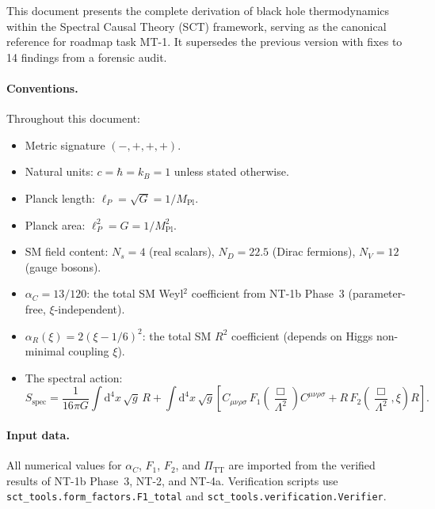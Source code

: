 \documentclass[11pt,a4paper]{article}
\renewcommand{\dd}{\mathrm{d}}
\newcommand{\PiTT}{\Pi_{\mathrm{TT}}}
\newcommand{\lP}{\ell_P}
\newcommand{\MP}{M_{\mathrm{Pl}}}
\theoremstyle{plain}
\theoremstyle{definition}
\begin{document}
This document presents the complete derivation of black hole thermodynamics
within the Spectral Causal Theory (SCT) framework, serving as the canonical
reference for roadmap task MT-1. It supersedes the previous version with
fixes to 14 findings from a forensic audit.

\paragraph{Conventions.}
Throughout this document:
\begin{itemize}[nosep]
  \item Metric signature $(-,+,+,+)$.
  \item Natural units: $c = \hbar = k_B = 1$ unless stated otherwise.
  \item Planck length: $\lP = \sqrt{G} = 1/\MP$.
  \item Planck area: $\lP^2 = G = 1/\MP^2$.
  \item SM field content: $N_s = 4$ (real scalars), $N_D = 22.5$ (Dirac fermions),
        $N_V = 12$ (gauge bosons).
  \item $\alpha_C = 13/120$: the total SM Weyl${}^2$ coefficient
        from NT-1b Phase~3 (parameter-free, $\xi$-independent).
  \item $\alpha_R(\xi) = 2(\xi - 1/6)^2$: the total SM $R^2$ coefficient
        (depends on Higgs non-minimal coupling $\xi$).
  \item The spectral action:
        \begin{equation}\label{eq:spectral-action}
          S_{\mathrm{spec}} = \frac{1}{16\pi G}\int\dd^4 x\,\sqrt{g}\,R
          + \int\dd^4 x\,\sqrt{g}\left[
            C_{\mu\nu\rho\sigma}\, F_1\!\left(\frac{\Box}{\Lambda^2}\right)
            C^{\mu\nu\rho\sigma}
            + R\, F_2\!\left(\frac{\Box}{\Lambda^2},\xi\right) R
          \right].
        \end{equation}
\end{itemize}

\paragraph{Input data.}
All numerical values for $\alpha_C$, $F_1$, $F_2$, and $\PiTT$ are
imported from the verified results of NT-1b Phase~3, NT-2, and NT-4a.
Verification scripts use \texttt{sct\_tools.form\_factors.F1\_total} and
\texttt{sct\_tools.verification.Verifier}.


\end{document}
